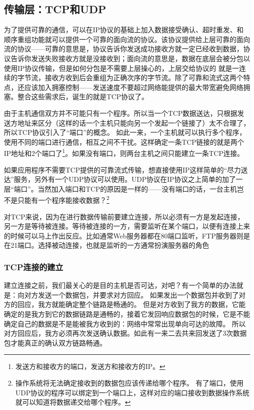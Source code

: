 \subsection{传输层：TCP和UDP}
为了提供可靠的通信，可以在IP协议的基础上加入数据接受确认、超时重发、和顺序重组功能就可以提供一个可靠的面向流的协议。该协议提供给上层可靠的面向流的协议——可靠的意思是，协议告诉你发送成功接收方就一定已经收到数据，协议告诉你发送失败接收方就是没接收到；面向流的意思是，数据在底层会被分包以使用IP协议传输，但是如何分包是不需要上层操心的，上层交给协议的 就是一连续的字节流，接收方收到后会重组为正确次序的字节流。除了可靠和流式这两个特点，还应该加入拥塞控制——发送速度不要超过网络能提供的最大带宽避免网络拥塞。整合这些需求后，诞生的就是TCP协议了。

由于主机通信双方并不可能只有一个程序。所以当一个TCP数据送达，只根据发送方地址来区分（这样的话一个主机只能向另一个发起一个链接了）太不合理了，所以TCP协议引入了“端口”的概念。
如此一来，一个主机就可以执行多个程序，使用不同的端口进行通信，相互之间不干扰。这样确定一条TCP链接的就是两个IP地址和2个端口了\footnote{发送方和接收方的端口，发送方和接收方的IP。}。如果没有端口，则两台主机之间只能建立一条TCP连接。

如果应用程序不需要TCP提供的可靠流式传输，想直接使用IP这样简单的“尽力送达”服务，另外有一个UDP协议可以使用。UDP协议在IP协议之上简单的加了一层“端口”。当然加入端口和TCP的原因是一样的——没有端口的话，一台主机岂不是只能有一个程序能接收数据？\footnote{操作系统将无法确定接收到的数据包应该传递给哪个程序。
有了端口，使用UDP协议的程序可以绑定到一个端口上，这样对应的端口接收到数据操作系统就可以知道将数据递交给哪个程序。}

对TCP来说，因为在进行数据传输前要建立连接，所以必须有一方是发起连接，另一方是等待被连接。等待被连接的一方，需要监听在某个端口，以便有连接上来的时候可以马上作出反应。比如通常Web服务器都在80端口监听，FTP服务器则是在21端口。选择被动连接，也就是监听的一方通常扮演服务器的角色

\subsubsection{TCP连接的建立}

建立连接之前，我们最关心的是目的主机是否可达，对吧？有一个简单的办法就是：向对方发送一个数据包，并要求对方回应。
如果发出一个数据包并收到了对方的回应，我方就能确定整个链路是畅通的。
但是对方收到了我方的数据，它能确定的是我方到它的数据链路是通畅的，接着它发回响应数据包的时候，它是不能确定自己的数据是不是能被我方收到的：网络中常常出现单向可达的故障。
所以对方回应后，我方必须再次发送确认数据。如此有一来二去共来回发送了3次数据包才能真正的确认双方链路畅通。

